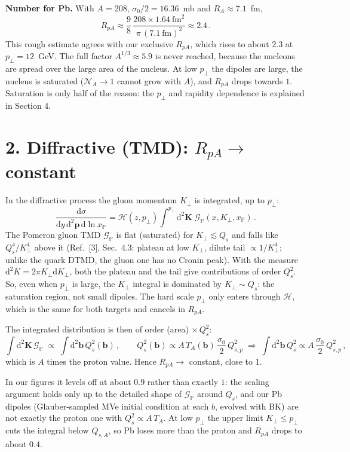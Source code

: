 \documentclass[12pt]{article}
\newcommand{\xpo}{x_{\mathbb{P}}}
\begin{document}
\textbf{Number for Pb.} With $A=208$, $\sigma_0/2=16.36$~mb and $R_A\approx7.1$~fm,
\[
  R_{pA}\approx\frac{9}{8}\,\frac{208\times1.64~\text{fm}^2}{\pi\,(7.1~\text{fm})^2}\approx2.4\,.
\]
This rough estimate agrees with our exclusive $R_{pA}$, which rises to about $2.3$ at
$p_\perp=12$~GeV. The full factor $A^{1/3}\approx5.9$ is never reached, because the nucleons are spread
over the large area of the nucleus. At low $p_\perp$ the dipoles are large, the nucleus is
saturated ($\mathcal{N}_A\to1$ cannot grow with $A$), and $R_{pA}$ drops towards $1$. Saturation is
only half of the reason: the $p_\perp$ and rapidity dependence is explained in Section 4.

\section*{2. Diffractive (TMD): $R_{pA}\to$ constant}

In the diffractive process the gluon momentum $K_\perp$ is integrated, up to $p_\perp$:
\[
  \frac{\mathrm{d}\sigma}{\mathrm{d}y\,\mathrm{d}^2\mathbf{p}\,\mathrm{d}\ln\xpo}
  =\mathcal{H}(z,p_\perp)\int^{p_\perp}\mathrm{d}^2\mathbf{K}\;\mathcal{G}_{\mathbb{P}}(x,K_\perp,\xpo)\,.
\]
The Pomeron gluon TMD $\mathcal{G}_{\mathbb{P}}$ is flat (saturated) for $K_\perp\lesssim Q_s$ and falls
like $Q_s^4/K_\perp^4$ above it (Ref.~[3], Sec.~4.3: plateau at low $K_\perp$, dilute tail
$\propto1/K_\perp^4$; unlike the quark DTMD, the gluon one has no Cronin peak). With the measure
$\mathrm{d}^2K=2\pi K_\perp\mathrm{d}K_\perp$, both the plateau and the tail give contributions of order
$Q_s^2$. So, even when $p_\perp$ is large, the $K_\perp$ integral is dominated by
$K_\perp\sim Q_s$: the saturation region, not small dipoles. The hard scale $p_\perp$ only enters
through $\mathcal{H}$, which is the same for both targets and cancels in $R_{pA}$.

The integrated distribution is then of order (area) $\times\,Q_s^2$:
\[
  \int\mathrm{d}^2\mathbf{K}\,\mathcal{G}_{\mathbb{P}}\;\propto\;\int\mathrm{d}^2\mathbf{b}\,Q_s^2(\mathbf{b})\,,
  \qquad Q_s^2(\mathbf{b})\propto A\,T_A(\mathbf{b})\,\frac{\sigma_0}{2}\,Q_{s,p}^2
  \;\Longrightarrow\;
  \int\mathrm{d}^2\mathbf{b}\,Q_s^2\propto A\,\frac{\sigma_0}{2}\,Q_{s,p}^2\,,
\]
which is $A$ times the proton value. Hence $R_{pA}\to$ constant, close to $1$.

In our figures it levels off at about $0.9$ rather than exactly $1$: the scaling argument holds only up
to the detailed shape of $\mathcal{G}_{\mathbb{P}}$ around $Q_s$, and our Pb dipoles (Glauber-sampled MVe
initial condition at each $b$, evolved with BK) are not exactly the proton one with
$Q_s^2\propto A\,T_A$. At low $p_\perp$ the upper limit $K_\perp\leq p_\perp$ cuts the integral below
$Q_{s,A}$, so Pb loses more than the proton and $R_{pA}$ drops to about $0.4$.
\end{document}

